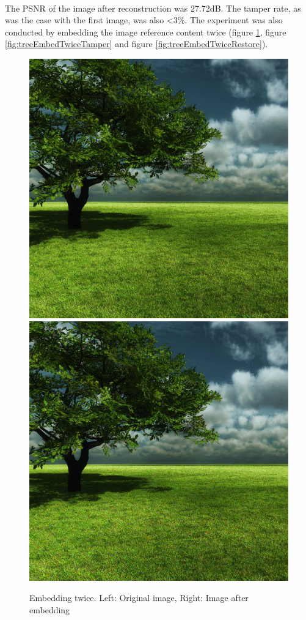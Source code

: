 \documentclass[12pt]{article}
\begin{document}
\hspace{0pt} \\
The PSNR of the image after reconstruction was 27.72dB.
The tamper rate, as was the case with the first image, was also \textless 3\%.
The experiment was also conducted by embedding the image reference content twice (figure \ref{fig:treeEmbedTwiceEmbedding}, figure \ref{fig:treeEmbedTwiceTamper} and figure \ref{fig:treeEmbedTwiceRestore}).

\begin{figure}[h]
\centerline{%
\includegraphics[scale=0.3375]{"tree"}%
\hspace{0.1cm}
\includegraphics[scale=0.45]{"Tree Embed twice 0.8 threshold/finalImage"}%
}%
\caption{Embedding twice. Left: Original image, Right: Image after embedding}
\label{fig:treeEmbedTwiceEmbedding}
\end{figure}
\end{document}
